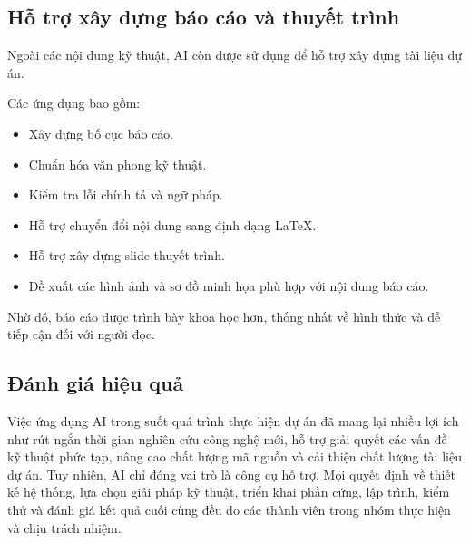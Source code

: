 \subsection{Hỗ trợ xây dựng báo cáo và thuyết trình}

Ngoài các nội dung kỹ thuật, AI còn được sử dụng để hỗ trợ xây dựng tài liệu dự án.

Các ứng dụng bao gồm:

\begin{itemize}
	\item Xây dựng bố cục báo cáo.
	\item Chuẩn hóa văn phong kỹ thuật.
	\item Kiểm tra lỗi chính tả và ngữ pháp.
	\item Hỗ trợ chuyển đổi nội dung sang định dạng \LaTeX.
	\item Hỗ trợ xây dựng slide thuyết trình.
	\item Đề xuất các hình ảnh và sơ đồ minh họa phù hợp với nội dung báo cáo.
\end{itemize}

Nhờ đó, báo cáo được trình bày khoa học hơn, thống nhất về hình thức và dễ tiếp cận đối với người đọc.

\subsection{Đánh giá hiệu quả}

Việc ứng dụng AI trong suốt quá trình thực hiện dự án đã mang lại nhiều lợi ích như rút ngắn thời gian nghiên cứu công nghệ mới, hỗ trợ giải quyết các vấn đề kỹ thuật phức tạp, nâng cao chất lượng mã nguồn và cải thiện chất lượng tài liệu dự án. Tuy nhiên, AI chỉ đóng vai trò là công cụ hỗ trợ. Mọi quyết định về thiết kế hệ thống, lựa chọn giải pháp kỹ thuật, triển khai phần cứng, lập trình, kiểm thử và đánh giá kết quả cuối cùng đều do các thành viên trong nhóm thực hiện và chịu trách nhiệm.
